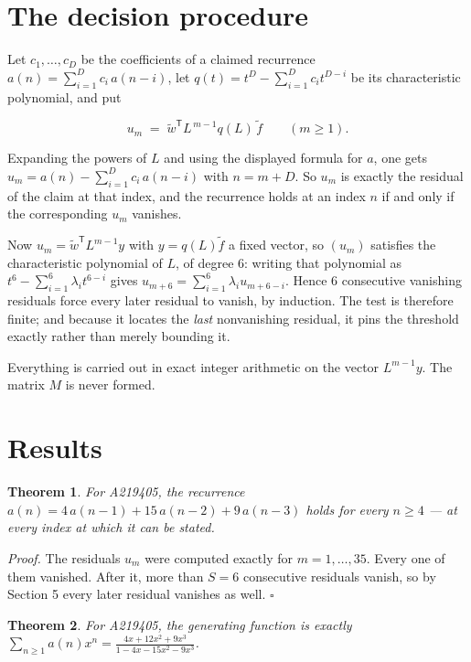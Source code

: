 \documentclass[11pt]{article}
\newtheorem{theorem}{Theorem}
\theoremstyle{definition}
\begin{document}
\section{The decision procedure}

Let $c_1,\dots,c_D$ be the coefficients of a claimed recurrence $a(n) = \sum_{i=1}^{D} c_i\,a(n-i)$, let $q(t) = t^{D} - \sum_{i=1}^{D} c_i t^{D-i}$ be its characteristic polynomial, and put

\[u_m \;=\; \tilde w^{\mathsf T} L^{\,m-1} q(L)\,\tilde f \qquad (m \ge 1).\]

Expanding the powers of $L$ and using the displayed formula for $a$, one gets $u_m = a(n) - \sum_{i=1}^{D} c_i\,a(n-i)$ with $n = m + D$. So $u_m$ is exactly the residual of the claim at that index, and the recurrence holds at an index $n$ if and only if the corresponding $u_m$ vanishes.

Now $u_m = \tilde w^{\mathsf T} L^{m-1} y$ with $y = q(L)\tilde f$ a fixed vector, so $(u_m)$ satisfies the characteristic polynomial of $L$, of degree $6$: writing that polynomial as $t^{6} - \sum_{i=1}^{6} \lambda_i t^{6-i}$ gives $u_{m+6} = \sum_{i=1}^{6} \lambda_i u_{m+6-i}$. Hence $6$ consecutive vanishing residuals force every later residual to vanish, by induction. The test is therefore finite; and because it locates the {\itshape last} nonvanishing residual, it pins the threshold exactly rather than merely bounding it.

Everything is carried out in exact integer arithmetic on the vector $L^{m-1}y$. The matrix $M$ is never formed.

\section{Results}

\begin{theorem} For A219405, the recurrence $a(n) = 4\,a(n-1) + 15\,a(n-2) + 9\,a(n-3)$ holds for every $n \ge 4$ --- at every index at which it can be stated.\end{theorem}

{\itshape Proof.} The residuals $u_m$ were computed exactly for $m = 1,\dots,35$. Every one of them vanished. After it, more than $S = 6$ consecutive residuals vanish, so by Section 5 every later residual vanishes as well. $\square$

\begin{theorem} For A219405, the generating function is exactly $\sum_{n\ge 1} a(n)x^n = \frac{4x + 12x^{2} + 9x^{3}}{1 - 4x - 15x^{2} - 9x^{3}}$.\end{theorem}
\end{document}
